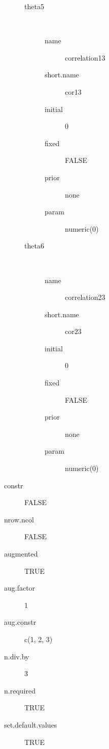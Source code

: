 \begin{description}
\begin{description}
	 	\item[theta5]\ 
	 	 \begin{description}
	 	 	 \item[ name ] correlation13 
	 	 	 \item[ short.name ] cor13 
	 	 	 \item[ initial ] 0 
	 	 	 \item[ fixed ] FALSE 
	 	 	 \item[ prior ] none 
	 	 	 \item[ param ] numeric(0) 
	 	 \end{description}
	 	\item[theta6]\ 
	 	 \begin{description}
	 	 	 \item[ name ] correlation23 
	 	 	 \item[ short.name ] cor23 
	 	 	 \item[ initial ] 0 
	 	 	 \item[ fixed ] FALSE 
	 	 	 \item[ prior ] none 
	 	 	 \item[ param ] numeric(0) 
	 	 \end{description}
	 \end{description}
	 \item[ constr ] FALSE 
	 \item[ nrow.ncol ] FALSE 
	 \item[ augmented ] TRUE 
	 \item[ aug.factor ] 1 
	 \item[ aug.constr ] c(1, 2, 3) 
	 \item[ n.div.by ] 3 
	 \item[ n.required ] TRUE 
	 \item[ set.default.values ] TRUE 
\end{description}
